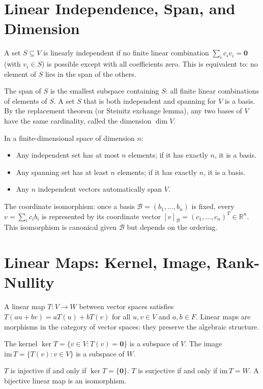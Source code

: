 \documentclass[11pt]{article}
\begin{document}
\section*{Linear Independence, Span, and Dimension}

A set $S \subseteq V$ is linearly independent if no finite linear combination $\sum_i c_i v_i = \mathbf{0}$ (with $v_i \in S$) is possible except with all coefficients zero. This is equivalent to: no element of $S$ lies in the span of the others.

The span of $S$ is the smallest subspace containing $S$: all finite linear combinations of elements of $S$. A set $S$ that is both independent and spanning for $V$ is a basis. By the replacement theorem (or Steinitz exchange lemma), any two bases of $V$ have the same cardinality, called the dimension $\dim V$.

In a finite-dimensional space of dimension $n$:
\begin{itemize}
  \item Any independent set has at most $n$ elements; if it has exactly $n$, it is a basis.
  \item Any spanning set has at least $n$ elements; if it has exactly $n$, it is a basis.
  \item Any $n$ independent vectors automatically span $V$.
\end{itemize}

The coordinate isomorphism: once a basis $\mathcal{B} = (b_1, \ldots, b_n)$ is fixed, every $v = \sum_i c_i b_i$ is represented by its coordinate vector $[v]_\mathcal{B} = (c_1, \ldots, c_n)^T \in \mathbb{R}^n$. This isomorphism is canonical given $\mathcal{B}$ but depends on the ordering.

\section*{Linear Maps: Kernel, Image, Rank-Nullity}

A linear map $T: V \to W$ between vector spaces satisfies $T(au + bv) = aT(u) + bT(v)$ for all $u,v \in V$ and $a,b \in F$. Linear maps are morphisms in the category of vector spaces: they preserve the algebraic structure.

The kernel $\ker T = \{v \in V : T(v) = \mathbf{0}\}$ is a subspace of $V$. The image $\text{im}\, T = \{T(v) : v \in V\}$ is a subspace of $W$.

$T$ is injective if and only if $\ker T = \{\mathbf{0}\}$. $T$ is surjective if and only if $\text{im}\, T = W$. A bijective linear map is an isomorphism.
\end{document}
